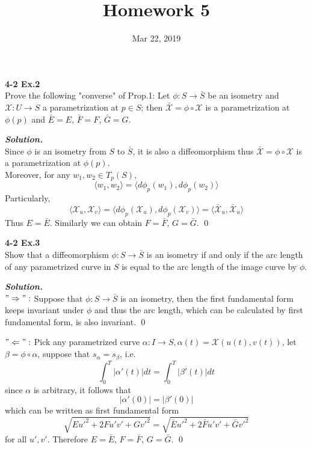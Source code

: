 \documentclass{article}
\begin{document}
\title{Homework 5}
\date{Mar 22, 2019}
\maketitle

\setlength\parindent{0em}   %
\setlength\parskip{1.0\baselineskip} %

\par
\textbf{4-2 Ex.2}\\
Prove the following "converse" of Prop.1: Let $\phi: S \to \bar S$ be an isometry
and $\mathcal{X}: U \to S$ a parametrization at $p \in S$; then
$\bar{\mathcal{X}} = \phi \circ \mathcal{X}$ is a parametrization at $\phi(p)$ and
$\bar E = E$, $\bar F = F$, $\bar G = G$.

\par
\textbf{\textit{Solution.}}\\
Since $\phi$ is an isometry from $S$ to $\bar S$, it is also a diffeomorphism thus
$\bar{\mathcal{X}} = \phi \circ \mathcal{X}$ is a parametrization at $\phi(p)$.\\
Moreover, for any $w_1, w_2 \in T_p(S)$, 
$$
    \langle w_1, w_2 \rangle = \langle d\phi_p(w_1), d\phi_p(w_2) \rangle
$$
Particularly,
$$
    \langle \mathcal{X}_u, \mathcal{X}_v \rangle 
    = \langle d\phi_p(\mathcal{X}_u), d\phi_p(\mathcal{X}_v) \rangle
    = \langle \bar{\mathcal{X}}_u, \bar{\mathcal{X}}_u \rangle
$$
Thus $E = \bar E$. Similarly we can obtain $F = \bar F$, $G = \bar G$. \qed

\par
\textbf{4-2 Ex.3}\\
Show that a diffeomorphism $\phi: S \to \bar S$ is an isometry if and only if the
arc length of any parametrized curve in $S$ is equal to the arc length of the
image curve by $\phi$.

\par
\textbf{\textit{Solution.}}\\
$"\Rightarrow":$
Suppose that $\phi: S \to \bar S$ is an isometry, then the first fundamental form
keeps invariant under $\phi$ and thus the arc length, which can be calculated by
first fundamental form, is also invariant. \qed

\par
$"\Leftarrow":$
Pick any parametrized curve $\alpha: I \to S, \alpha(t) = \mathcal{X}(u(t), v(t))$, 
let $\beta = \phi \circ \alpha$,
suppose that $s_\alpha = s_\beta$, i.e.
$$
    \int_0^T |\alpha'(t)|dt = \int_0^T |\beta'(t)|dt
$$
since $\alpha$ is arbitrary, it follows that
$$
    |\alpha'(0)| = |\beta'(0)|
$$
which can be written as first fundamental form
$$
    \sqrt{Eu'^2 + 2Fu'v' + Gv'^2} = \sqrt{\bar Eu'^2 + 2\bar Fu'v' + \bar Gv'^2}
$$
for all $u', v'$. Therefore $E = \bar E$, $F = \bar F$, $G = \bar G$. \qed
\end{document}

